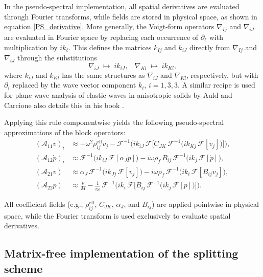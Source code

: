 \documentclass[pdflatex,sn-mathphys-num]{sn-jnl}
\theoremstyle{thmstyleone}%
\theoremstyle{thmstyletwo}%
\theoremstyle{thmstylethree}%
\theoremstyle{definition}
\begin{document}
	In the pseudo-spectral implementation, all spatial derivatives are evaluated through Fourier transforms, while fields are stored in physical space, as shown in equation \eqref{PS_derivative}. More generally, the Voigt-form operators $\nabla_{Ij}$ and $\nabla_{iJ}$ are evaluated in Fourier space by replacing each occurrence of $\partial_\ell$ with multiplication by $i k_\ell$. This defines the matrices $k_{Ij}$ and $k_{iJ}$ directly from $\nabla_{Ij}$ and $\nabla_{iJ}$ through the substitutions
	\[
	\nabla _{iJ} \;\mapsto\; ik_{iJ}, ~~~~\nabla _{Kl} \;\mapsto\; ik_{Kl},
	\]
	where $k_{iJ}$ and $k_{Kl}$ has the same structures as $\nabla _{iJ}$ and $\nabla _{Kl}$, respectively, but with $\partial _{i}$ replaced by the wave vector component $k_{i}$, $i= 1,3,3$. A similar recipe is used for plane wave analysis of elastic waves in anisotropic solids by Auld \cite{Auld1973} and Carcione also details this in his book \cite{Carcione2022}. 
	
	Applying this rule componentwise yields the following pseudo-spectral approximations of the block operators:
	\[
	\begin{aligned}
		(\mathcal{A}_{11} v)_i 
		&\approx -\omega^2 \rho^{\mathrm{eff}}_{ij} v_j 
		- \mathcal{F}^{-1}\Bigg( i k_{iJ} \,\mathcal{F}\Big[
		C_{JK} \,
		\mathcal{F}^{-1}\big( i k_{Kj} \,\mathcal{F}[v_j] \big)
		\Big]\Bigg), \\
		(\mathcal{A}_{12} \dot p)_i 
		&\approx \mathcal{F}^{-1}\Big( i k_{iJ} \,\mathcal{F}[ \alpha_J \dot p ] \Big)
		- i\omega \rho_f \, B_{ij} \,
		\mathcal{F}^{-1}\big( i k_j \,\mathcal{F}[\dot p] \big), \\
		(\mathcal{A}_{21} v) 
		&\approx \alpha_J \,
		\mathcal{F}^{-1}\big( i k_{Jj} \,\mathcal{F}[v_j] \big)
		- i\omega \rho_f \,
		\mathcal{F}^{-1}\Big( i k_i \,\mathcal{F}[ B_{ij} v_j ] \Big), \\
		(\mathcal{A}_{22} \dot p) 
		&\approx \frac{\dot p}{M}
		- \frac{1}{i\omega} \,
		\mathcal{F}^{-1}\Bigg( i k_i \,\mathcal{F}\Big[
		B_{ij} \,
		\mathcal{F}^{-1}\big( i k_j \,\mathcal{F}[\dot p] \big)
		\Big]\Bigg).
	\end{aligned}
	\]
	
	All coefficient fields (e.g., $\rho^{\mathrm{eff}}_{ij}$, $C_{JK}$, $\alpha_J$, and $B_{ij}$) are applied pointwise in physical space, while the Fourier transform is used exclusively to evaluate spatial derivatives.
	
	
	
	
	\subsection{Matrix-free implementation of the splitting scheme}
	
\end{document}
